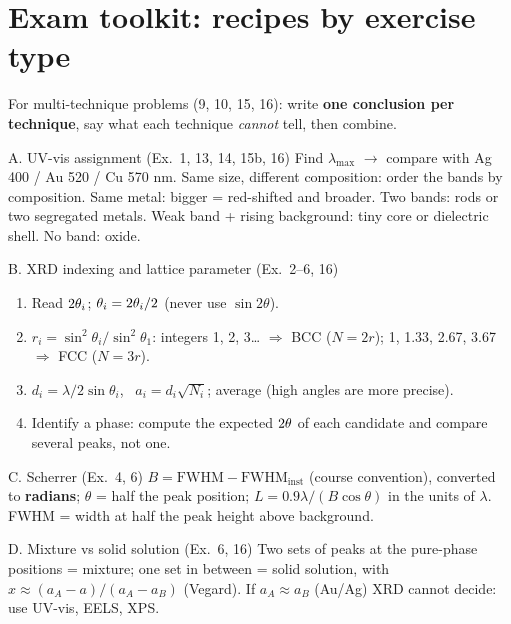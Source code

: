 \section{Exam toolkit: recipes by exercise type}
\label{sec:toolkit}
For multi-technique problems (9, 10, 15, 16): write \textbf{one conclusion per technique}, say what each technique
\emph{cannot} tell, then combine.

\begin{recipe}{A. UV-vis assignment (Ex.~1, 13, 14, 15b, 16)}
Find $\lambda_\mathrm{max}$ $\to$ compare with Ag 400 / Au 520 / Cu 570 nm. Same size, different composition: order the bands by
composition. Same metal: bigger = red-shifted and broader. Two bands: rods or two segregated metals. Weak band + rising background:
tiny core or dielectric shell. No band: oxide.
\end{recipe}

\begin{recipe}{B. XRD indexing and lattice parameter (Ex.~2--6, 16)}
\begin{enumerate}
  \item Read $2\theta_i$; $\theta_i = 2\theta_i/2$ (never use $\sin 2\theta$).
  \item $r_i = \sin^2\theta_i/\sin^2\theta_1$: integers 1, 2, 3\ldots{} $\Rightarrow$ BCC ($N=2r$); 1, 1.33, 2.67, 3.67 $\Rightarrow$ FCC ($N=3r$).
  \item $d_i = \lambda/2\sin\theta_i$, \ $a_i = d_i\sqrt{N_i}$; average (high angles are more precise).
  \item Identify a phase: compute the expected $2\theta$ of each candidate and compare several peaks, not one.
\end{enumerate}
\end{recipe}

\begin{recipe}{C. Scherrer (Ex.~4, 6)}
$B = \mathrm{FWHM} - \mathrm{FWHM}_\mathrm{inst}$ (course convention), converted to \textbf{radians}; $\theta$ = half the peak position;
$L = 0.9\lambda/(B\cos\theta)$ in the units of $\lambda$. FWHM = width at half the peak height above background.
\end{recipe}

\begin{recipe}{D. Mixture vs solid solution (Ex.~6, 16)}
Two sets of peaks at the pure-phase positions = mixture; one set in between = solid solution, with
$x\approx(a_A-a)/(a_A-a_B)$ (Vegard\extra). If $a_A\approx a_B$ (Au/Ag) XRD cannot decide: use UV-vis, EELS, XPS.
\end{recipe}

